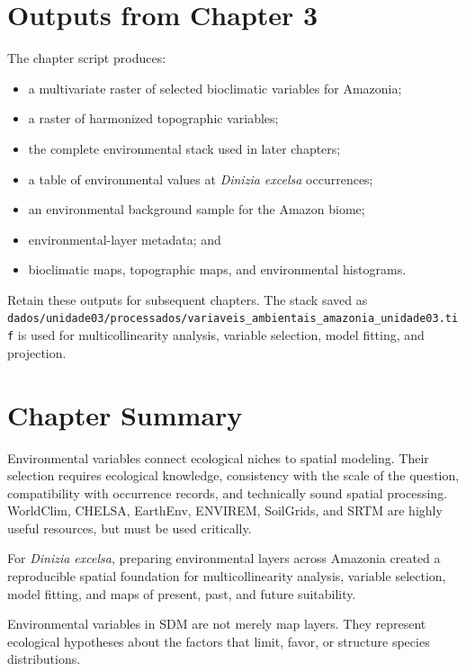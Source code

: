 \section{Outputs from Chapter 3}

The chapter script produces:

\begin{itemize}
  \item a multivariate raster of selected bioclimatic variables for Amazonia;
  \item a raster of harmonized topographic variables;
  \item the complete environmental stack used in later chapters;
  \item a table of environmental values at \textit{Dinizia excelsa} occurrences;
  \item an environmental background sample for the Amazon biome;
  \item environmental-layer metadata; and
  \item bioclimatic maps, topographic maps, and environmental histograms.
\end{itemize}

\begin{dica}[title={\faLightbulb\quad File organization}]
Retain these outputs for subsequent chapters. The stack saved as
\texttt{dados/unidade03/processados/variaveis\_ambientais\_amazonia\_unidade03.tif}
is used for multicollinearity analysis, variable selection, model fitting, and
projection.
\end{dica}

\section{Chapter Summary}

Environmental variables connect ecological niches to spatial modeling. Their
selection requires ecological knowledge, consistency with the scale of the
question, compatibility with occurrence records, and technically sound spatial
processing. WorldClim, CHELSA, EarthEnv, ENVIREM, SoilGrids, and SRTM are highly
useful resources, but must be used critically.

For \textit{Dinizia excelsa}, preparing environmental layers across Amazonia
created a reproducible spatial foundation for multicollinearity analysis,
variable selection, model fitting, and maps of present, past, and future
suitability.

\begin{conceito}[title={\faBook\quad Key message}]
Environmental variables in SDM are not merely map layers. They represent
ecological hypotheses about the factors that limit, favor, or structure species
distributions.
\end{conceito}

